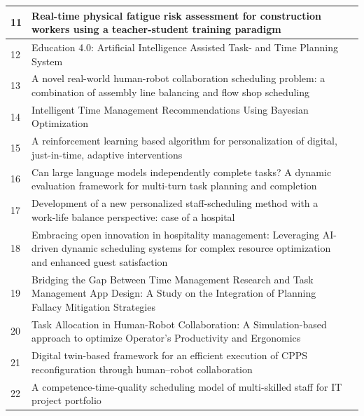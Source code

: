 \begin{table}[htbp!]
\begin{tabular}{p{0.3cm}p{11.5cm}p{3cm}}
11 & Real-time physical fatigue risk assessment for construction workers using a teacher-student training paradigm & \cite{fatigue2025} \\ \hline
12 & Education 4.0: Artificial Intelligence Assisted Task- and Time Planning System & \cite{education2022} \\ \hline
13 & A novel real-world human-robot collaboration scheduling problem: a combination of assembly line balancing and flow shop scheduling & \cite{novelHCR2025} \\ \hline
14 & Intelligent Time Management Recommendations Using Bayesian Optimization & \cite{bayesian2024} \\ \hline
15 & A reinforcement learning based algorithm for personalization of digital, just-in-time, adaptive interventions & \cite{inTimeRL2021} \\ \hline
16 & Can large language models independently complete tasks? A dynamic evaluation framework for multi-turn task planning and completion & \cite{LLM2025} \\ \hline
17 & Development of a new personalized staff-scheduling method with a work-life balance perspective: case of a hospital & \cite{workLifeBalance2023} \\ \hline
18 & Embracing open innovation in hospitality management: Leveraging AI-driven dynamic scheduling systems for complex resource optimization and enhanced guest satisfaction & \cite{hospitality2025} \\ \hline
19 & Bridging the Gap Between Time Management Research and Task Management App Design: A Study on the Integration of Planning Fallacy Mitigation Strategies & \cite{gap2024} \\ \hline
20 & Task Allocation in Human-Robot Collaboration: A Simulation-based approach to optimize Operator's Productivity and Ergonomics & \cite{TaskAllocation2024} \\ \hline
21 & Digital twin-based framework for an efficient execution of CPPS reconfiguration through human–robot collaboration & \cite{twin2025} \\ \hline
22 & A competence-time-quality scheduling model of multi-skilled staff for IT project portfolio & \cite{competenceTimeQuality2020} \\ \hline
\end{tabular}
\end{table}


